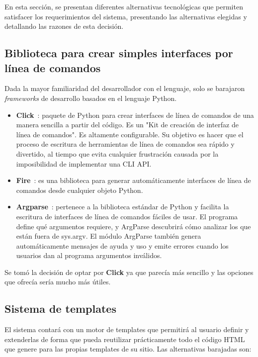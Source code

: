 En esta sección, se presentan diferentes alternativas tecnológicas que permiten
satisfacer los requerimientos del sistema, presentando las alternativas elegidas y
detallando las razones de esta decisión.

\subsection{Biblioteca para crear simples interfaces por línea de comandos}

Dada la mayor familiaridad del desarrollador con el lenguaje, solo se barajaron
\textit{frameworks} de desarrollo basados en el lenguaje Python.

\begin{itemize}
    \item \textbf{Click}~\cite{click}: paquete de Python para crear interfaces de línea de comandos de
una manera sencilla a partir del código. Es un "Kit de creación de interfaz de
línea de comandos". Es altamente configurable. Su objetivo es
hacer que el proceso de escritura de herramientas de línea de comandos sea rápido y divertido, al tiempo
que evita cualquier frustración causada por la imposibilidad de implementar una CLI API.
\item \textbf{Fire}~\cite{python-fire}: es una biblioteca para generar automáticamente interfaces de línea de comandos
desde cualquier objeto Python.
\item \textbf{Argparse}~\cite{argparse}: pertenece a la biblioteca estándar de Python y facilita la escritura de interfaces
de línea de comandos fáciles de usar. El programa define qué argumentos requiere, y ArgParse descubrirá cómo
analizar los que están fuera de sys.argv. El módulo ArgParse también genera automáticamente mensajes de ayuda
y uso y emite errores cuando los usuarios dan al programa argumentos inválidos.
\end{itemize}

Se tomó la decisión de optar por \textbf{Click} ya que parecía más sencillo y las opciones que ofrecía sería mucho
más útiles.

\subsection{Sistema de templates}

El sistema contará con un motor de templates que permitirá al usuario definir y extenderlas de forma que pueda reutilizar
prácticamente todo el código HTML que genere para las propias templates de su sitio. Las alternativas barajadas son:



